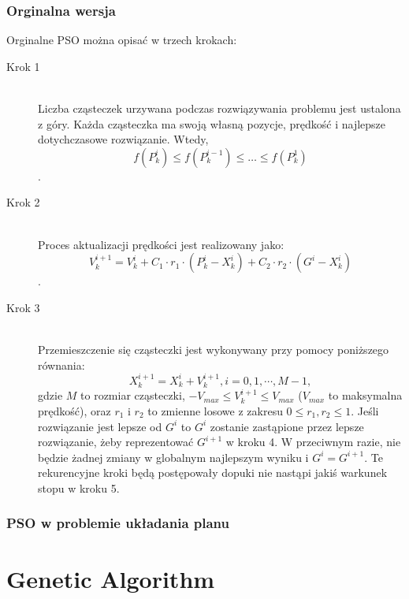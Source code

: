 \documentclass[11pt]{report}
\begin{document}
\subsubsection{Orginalna wersja}
\par Orginalne PSO można opisać w trzech krokach:

\begin{description}
  \item[Krok 1] \hfill \\
Liczba cząsteczek urzywana podczas rozwiązywania problemu jest ustalona z góry. Każda cząsteczka ma swoją własną pozycje, prędkość i najlepsze dotychczasowe rozwiązanie. Wtedy,
  \[f(P^{i}_{k}) \le f(P^{i-1}_{k}) \le \ldots \le f(P^{1}_{k})\].

  \item[Krok 2] \hfill \\
Proces aktualizacji prędkości jest realizowany jako:
\[V^{i+1}_{k} = V^{i}_{k} + C_{1} \cdot r_{1} \cdot (P^{i}_{k} - X^{i}_{k}) + C_{2} \cdot r_{2} \cdot (G^{i} - X^{i}_{k})\].
  \item[Krok 3] \hfill \\
Przemieszczenie się cząsteczki jest wykonywany przy pomocy poniższego równania:
\[X^{i+1}_{k} = X^{i}_{k} + V^{i+1}_{k}, i = 0,1,\cdots, M-1,\]
gdzie $M$ to rozmiar cząsteczki, $-V_{max} \le V^{i+1}_{k} \le V_{max}$ ($V_{max}$ to maksymalna prędkość), oraz $r_{1}$ i $r_{2}$ to zmienne losowe z zakresu $0 \le r_{1},r_{2} \le 1$. Jeśli rozwiązanie jest lepsze od $G^{i}$ to $G^{i}$ zostanie zastąpione przez lepsze rozwiązanie, żeby reprezentować $G^{i+1}$ w kroku 4. W przeciwnym razie, nie będzie żadnej zmiany w globalnym najlepszym wyniku i $G^{i} = G^{i+1}$. Te rekurencyjne kroki będą postępowały dopuki nie nastąpi jakiś warkunek stopu w kroku 5.  
\end{description}

\subsubsection{PSO w problemie układania planu}
\section{Genetic Algorithm}
\author{Filip Czajkowski}
\end{document}
